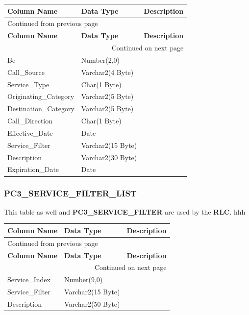 \documentclass[12pt,twoside]{article}
\begin{document}
\begin{longtable}{l|l|l}
\hline
\textbf{Column Name} & \textbf{Data Type} & \textbf{Description}\\
\hline
\endfirsthead
\multicolumn{3}{l}{Continued from previous page} \\
\hline

\textbf{Column Name} & \textbf{Data Type} & \textbf{Description} \\

\hline
\endhead
\hline\multicolumn{3}{r}{Continued on next page} \\
\endfoot
\endlastfoot
\hline
Be & Number(2,0) & \\
Call\_Source & Varchar2(4 Byte) & \\
Service\_Type & Char(1 Byte) & \\
Originating\_Category & Varchar2(5 Byte) & \\
Destination\_Category & Varchar2(5 Byte) & \\
Call\_Direction & Char(1 Byte) & \\
Effective\_Date & Date & \\
Service\_Filter & Varchar2(15 Byte) & \\
Description & Varchar2(30 Byte) & \\
Expiration\_Date & Date & \\
\hline
\end{longtable}

\normalsize

\subsubsection{PC3\_SERVICE\_FILTER\_LIST}
\label{sec:orgheadline116}

This table as well and \textbf{PC3\_SERVICE\_FILTER} are used by
the \textbf{RLC}.
\footnotesize
hhh
\begin{longtable}{l|l|l}
\hline
\textbf{Column Name} & \textbf{Data Type} & \textbf{Description}\\
\hline
\endfirsthead
\multicolumn{3}{l}{Continued from previous page} \\
\hline

\textbf{Column Name} & \textbf{Data Type} & \textbf{Description} \\

\hline
\endhead
\hline\multicolumn{3}{r}{Continued on next page} \\
\endfoot
\endlastfoot
\hline
Service\_Index & Number(9,0) & \\
Service\_Filter & Varchar2(15 Byte) & \\
Description & Varchar2(50 Byte) & \\
\hline
\end{longtable}
\end{document}
